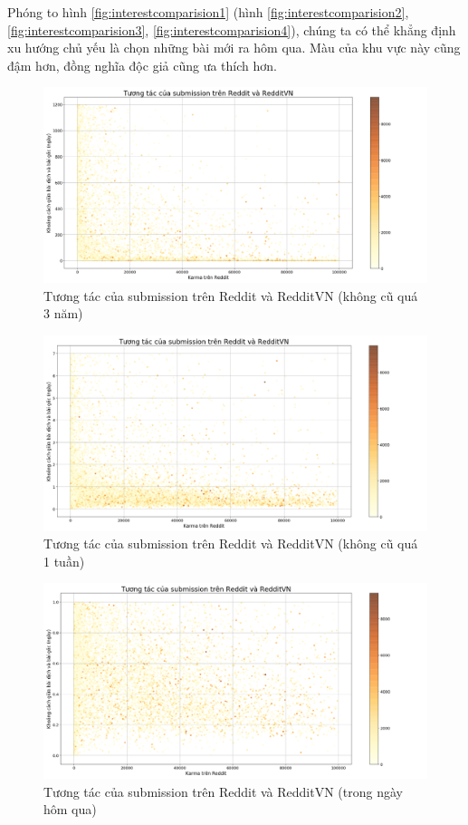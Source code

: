 \documentclass[10pt,a4paper]{article}
\begin{document}
Phóng to hình \eqref{fig:interestcomparision1} (hình \eqref{fig:interestcomparision2}, \eqref{fig:interestcomparision3}, \eqref{fig:interestcomparision4}), chúng ta có thể khẳng định xu hướng chủ yếu là chọn những bài mới ra hôm qua. Màu của khu vực này cũng đậm hơn, đồng nghĩa độc giả cũng ưa thích hơn.
\begin{figure}[!hb]
    \centering
    \includegraphics[width=\textwidth]{img/InterestComparision_1200D.png}
    \caption{Tương tác của submission trên Reddit và RedditVN (không cũ quá 3 năm)}
    \label{fig:interestcomparision2}
\end{figure}
\begin{figure}[!ht]
    \centering
    \includegraphics[width=\textwidth]{img/InterestComparision_7D.png}
    \caption{Tương tác của submission trên Reddit và RedditVN (không cũ quá 1 tuần)}
    \label{fig:interestcomparision3}
\end{figure}
\begin{figure}[!hb]
    \centering
    \includegraphics[width=\textwidth]{img/InterestComparision_1D.png}
    \caption{Tương tác của submission trên Reddit và RedditVN (trong ngày hôm qua)}
    \label{fig:interestcomparision4}
\end{figure}
\end{document}
